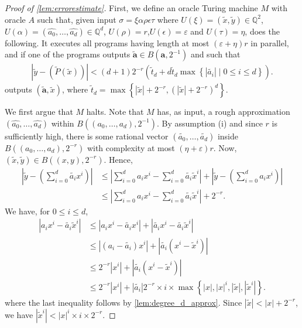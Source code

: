 \documentclass[a4paper,UKenglish,cleveref,autoref,thm-restate]{lipics-v2021}
\newcommand{\Q}{\mathbb{Q}}
\newcommand{\snt}[1]{\tilde{#1}}
\begin{document}
\begin{proof}[Proof of \cref{lem:errorestimate}]
	First, we define an oracle Turing machine $M$ with oracle $A$ such
	that, given input $\sigma=\xi\alpha\rho\epsilon\tau$ where
	$U(\xi)=(\snt x ,\snt y
	)\in\Q^2$,$U(\alpha)=(\hat{a_0},\dots,\hat{a_d})\in\Q^d$,
	$U(\rho)=r$,$U(\epsilon)=\varepsilon$ and $U(\tau)=\eta$, does the
	following. It executes all programs having length at most
	$(\varepsilon+\eta)r$ in parallel, and if one of the programs
	outputs $\snt {\mathbf{a}} \in B\left(\mathbf{a},2^{-1}\right)$ and such that
	\begin{align*}
		|\snt y-\left(\snt P\left(\snt x\right)\right)|<
		\left(d+1\right)2^{-r} \left(\tilde{t}_d +
		d\tilde{t}_d\max\left\{|\tilde{a_i}|\mid 0\le i \le d\right\} \right).
	\end{align*}
	outputs $(\snt{\mathbf{a}},\snt x)$, where 
	$\tilde{t}_d =
	\max\left\{|\tilde{x}|+2^{-r},\left(|\tilde{x}|+2^{-r}\right)^d\right\}$.
	
	We first argue that $M$ halts. Note that $M$ has, as input, a rough
	approximation $(\hat{a_0},\dots,\hat{a_d})$ within $B\left((a_0,\ldots,a_d),2^{-1}\right)$.
	By assumption (i) and since $r$ is sufficiently high, there is some
	rational vector $(\tilde{a_0},\dots,\tilde{a_d})$ inside
	$B\left((a_0,\ldots,a_d),2^{-r}\right)$ with complexity at most $(\eta+\varepsilon)r$. Now,
	$(\snt x, \snt y) \in B((x,y),2^{-r})$. Hence,
	\begin{align*}
		\left|\tilde{y}-\left(\sum_{i=0}^d \tilde{a_i}x^i\right)\right|
		&\le
		\left|\sum_{i=0}^d a_ix^i- \sum_{i=0}^d\tilde{a_i}\tilde{x}^i\right|+ 
		\left|\tilde{y}-\left(\sum_{i=0}^d a_ix^i\right)\right|\\
		&\le
		\left|\sum_{i=0}^d a_ix^i- \sum_{i=0}^d\tilde{a_i}\tilde{x}^i\right|+ 
		2^{-r}. 
	\end{align*}
	We have, for $0\le i\le d$,
	\begin{align*}
		|a_ix^i-\tilde{a_i}\tilde{x}^i|
		&\le|a_ix^i-\tilde{a_i}x^i|+|\tilde{a_i}x^i-\tilde{a_i}\tilde{x}^i|\\
		&\le|(a_i-\tilde{a_i}) x^i|+|\tilde{a_i}(x^i-\tilde{x}^i)|\\
		&\le2^{-r}|x^i|+|\tilde{a_i}(x^i-\tilde{x}^i)|\\
		&\le2^{-r}|x^i|+|\tilde{a_i}|2^{-r}\times i\times 
		\max\left\{|x|,|x|^i,|\tilde{x}|,|\tilde{x}^i|\right\}.
	\end{align*}
	where the last inequality follows by \cref{lem:degree_d_approx}. Since
	$|\tilde{x}|<|x|+2^{-r}$, we have
	$|\tilde{x}^i|<|x|^i\times i\times2^{-r}$.
	

\end{proof}
\end{document}
